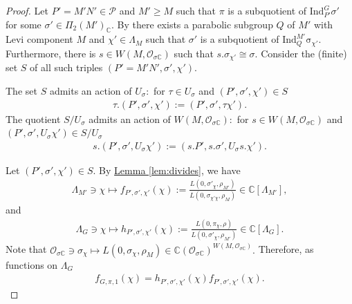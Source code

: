\documentclass[10pt]{amsart}
\theoremstyle{definition}
\numberwithin{equation}{section}
\numberwithin{equation}{subsection}
\newcommand{\Ind}{\mathrm{Ind}}
\newcommand{\CC}{\mathbb{C}}
\begin{document}
\begin{proof} 
Let $P'=M'N'\in \mathcal{P}$ and $M'\ge M$ such that $\pi$ is a subquotient of $\Ind_{P'}^G \sigma'$ for some $\sigma'\in \Pi_2(M')_\CC.$ By \cite[Th\'eor\`eme VI.5.4]{Representation-p-adic} there exists a parabolic subgroup $Q$ of $M'$ with Levi component $M$ and $\chi'\in \Lambda_M$ such that $\sigma'$ is a subquotient of $\mathrm{Ind}_{Q}^{M'} \mathrm{\sigma}_{\chi'}.$ Furthermore, there is $s\in W(M,\mathcal{O}_{\sigma\CC})$ such that $s.\sigma_{\chi'}\cong \sigma.$ Consider the (finite) set $S$ of all such triples $(P'=M'N',\sigma',\chi').$ 

The set $S$ admits an action of $U_\sigma:$ for $\tau\in U_\sigma$ and $(P',\sigma',\chi')\in S$
\begin{align*}
   \tau. (P',\sigma',\chi'):=(P',\sigma',\tau\chi').
\end{align*}
The quotient $S/U_\sigma$ admits an action of $W(M,\mathcal{O}_{\sigma\CC}):$ for $s\in W(M,\mathcal{O}_{\sigma\CC})$ and $(P',\sigma',U_\sigma\chi')\in S/U_\sigma$
\begin{align*}
   s. (P',\sigma',U_\sigma\chi'):=(s.P',s.\sigma',U_\sigma s.\chi').
\end{align*}

 
 Let $(P',\sigma',\chi')\in S.$ By \hyperref[lem:divides]{Lemma \ref{lem:divides}}, we have
\begin{align}\label{eq:intermediate}
     \Lambda_{M'}\ni\chi \mapsto f_{P',\sigma',\chi'}(\chi):=\frac{L(0,\sigma'_\chi,\rho_{M'})}{L(0,\sigma_{\chi'\chi},\rho_M)}\in\CC[\Lambda_{M'}],
\end{align}
and
\begin{align}\label{eq:intermediate2}
    \Lambda_{G}\ni\chi \mapsto h_{P',\sigma',\chi'}(\chi):=\frac{L(0,\pi_{\chi},\rho)}{L(0,\sigma'_\chi,\rho_{M'})} \in \CC[\Lambda_{G}].
\end{align}
Note that $\mathcal{O}_{\sigma\CC}\ni \sigma_\chi\mapsto L(0,\sigma_\chi,\rho_M)\in \CC(\mathcal{O}_{\sigma\CC})^{W(M,\mathcal{O}_{\sigma\CC})}.$ Therefore, as functions on $\Lambda_G$
\begin{align*}
    f_{G,\pi,1}(\chi) = h_{P',\sigma',\chi'}(\chi)f_{P',\sigma',\chi'}(\chi).
\end{align*}


\end{proof}
\end{document}
